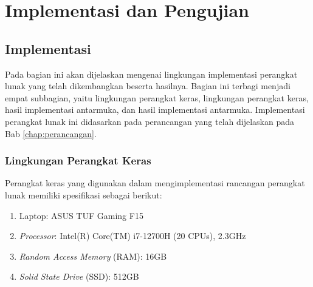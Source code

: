 \chapter{Implementasi dan Pengujian}
\label{chap:implementasidanpengujian}

\section{Implementasi}
\label{sec:implementasi}
Pada bagian ini akan dijelaskan mengenai lingkungan implementasi perangkat lunak yang telah dikembangkan beserta hasilnya. Bagian ini terbagi menjadi empat subbagian, yaitu lingkungan perangkat keras, lingkungan perangkat keras, hasil implementasi antarmuka, dan hasil implementasi antarmuka. Implementasi perangkat lunak ini didasarkan pada perancangan yang telah dijelaskan pada Bab \ref{chap:perancangan}.

\subsection{Lingkungan Perangkat Keras}
\label{subsec:lingkunganperangkatkeras}
Perangkat keras yang digunakan dalam mengimplementasi rancangan perangkat lunak memiliki spesifikasi sebagai berikut:
\begin{enumerate}
    \item Laptop: ASUS TUF Gaming F15
    \item \textit{Processor}: Intel(R) Core(TM) i7-12700H (20 CPUs), 2.3GHz
    \item \textit{Random Access Memory} (RAM): 16GB
    \item \textit{Solid State Drive} (SSD): 512GB
\end{enumerate}

